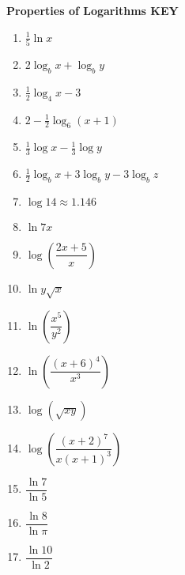 \documentclass[11pt,a4paper]{article}
\begin{document}







\textbf{Properties of Logarithms KEY}
\begin{enumerate}
    \item $\frac{1}{5}\ln x$
    \item $2\log_b x + \log_b y$
    \item $\frac{1}{2}\log_4 x - 3$
    \item $2 - \frac{1}{2}\log_6 (x+1)$
    \item $\frac{1}{3}\log x - \frac{1}{3}\log y$
    \item $\frac{1}{2}\log_b x + 3\log_b y - 3\log_b z$
    \item $\log 14 \approx 1.146$
    \item $\ln 7x$
    \item $\log \left(\dfrac{2x+5}{x}\right)$
    \item $\ln y\sqrt{x}$
    \item $\ln \left( \dfrac{x^5}{y^2} \right)$
    \item $\ln \left( \dfrac{(x+6)^4}{x^3} \right)$
    \item $\log\left(\sqrt{xy}\right)$
    \item $\log\left(\dfrac{(x+2)^7}{x(x+1)^3}\right)$
    \item $\dfrac{\ln 7}{\ln 5}$
    \item $\dfrac{\ln 8}{\ln \pi}$
    \item $\dfrac{\ln 10}{\ln 2}$
\end{enumerate}
\end{document}
